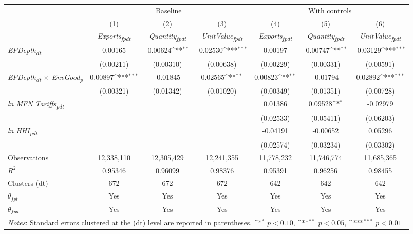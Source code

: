 {
\def\sym#1{\ifmmode^{#1}\else\(^{#1}\)\fi}
\begin{tabular}{l*{6}{c}}
\toprule
&\multicolumn{3}{c}{Baseline}&\multicolumn{3}{c}{With controls}\\\cmidrule(lr){2-4}\cmidrule(lr){5-7}
&(1)&(2)&(3)&(4)&(5)&(6)\\
&\textit{Exports\textsubscript{fpdt}}&\textit{Quantity\textsubscript{fpdt}}&\textit{UnitValue\textsubscript{fpdt}}&\textit{Exports\textsubscript{fpdt}}&\textit{Quantity\textsubscript{fpdt}}&\textit{UnitValue\textsubscript{fpdt}}\\
\midrule
\textit{EPDepth\textsubscript{dt}} & 0.00165 & -0.00624\sym{**} & -0.02530\sym{***} & 0.00197 & -0.00747\sym{**} & -0.03129\sym{***}\\
 & (0.00211) & (0.00310) & (0.00638) & (0.00229) & (0.00331) & (0.00591)\\
\addlinespace
\textit{EPDepth\textsubscript{dt} $\times$ EnvGood\textsubscript{p}} & 0.00897\sym{***} & -0.01845 & 0.02565\sym{**} & 0.00823\sym{**} & -0.01794 & 0.02892\sym{***}\\
 & (0.00321) & (0.01342) & (0.01020) & (0.00349) & (0.01351) & (0.00728)\\
\addlinespace
\textit{ln MFN Tariffs\textsubscript{pdt}} &  &  &  & 0.01386 & 0.09528\sym{*} & -0.02979\\
 &  &  &  & (0.02533) & (0.05411) & (0.06203)\\
\addlinespace
\textit{ln HHI\textsubscript{pdt}} &  &  &  & -0.04191 & -0.00652 & 0.05296\\
 &  &  &  & (0.02574) & (0.03234) & (0.03302)\\
\midrule
Observations & 12,338,110 & 12,305,429 & 12,241,355 & 11,778,232 & 11,746,774 & 11,685,365\\
$R^{2}$ & 0.95346 & 0.96099 & 0.98376 & 0.95391 & 0.96256 & 0.98455\\
Clusters (dt) & 672 & 672 & 672 & 642 & 642 & 642\\
$\theta_{fpt}$ & Yes & Yes & Yes & Yes & Yes & Yes\\
$\theta_{fpd}$ & Yes & Yes & Yes & Yes & Yes & Yes\\
\bottomrule
\multicolumn{7}{l}{\footnotesize \textit{Notes}: Standard errors clustered at the (dt) level are reported in parentheses. \sym{*} \(p<0.10\), \sym{**} \(p<0.05\), \sym{***} \(p<0.01\)}\\
\end{tabular}
}
